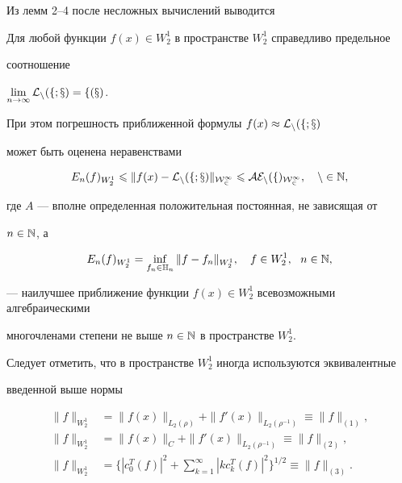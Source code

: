 Из лемм 2--4 после несложных вычислений выводится








\begin{thm}


Для любой функции $f(x) \in W_2^1$ в пространстве $W_2^1$ справедливо предельное


соотношение


$\lim\limits_{n\rightarrow \infty}\cal{L}_n(f;x)=f(x)$.


При этом погрешность приближенной формулы $f(x)\approx \cal{L}_n(f;x)$


может быть оценена неравенствами


\begin{equation}


E_n(f)_{W_2^1}\lea \|f(x)-\cal{L}_n(f;x)\|_{W_2^1} \lea A E_n(f)_{W_2^1},


\quad n\in \N,


\end{equation}


где $A$ --- вполне определенная положительная постоянная, не зависящая от 


$n \in \Bbb{N}$, а


$$


E_n(f)_{W_2^1}=\inf_{f_n \in \bH_n}\|f-f_n\|_{W_2^1},


\quad f \in W_2^1,\ \ n\in \N ,


$$


--- наилучшее приближение функции $f(x)\in W_2^1$ всевозможными алгебраическими


многочленами степени не выше $n \in \Bbb{N}$ в пространстве $W_2^1$.


\end{thm}





Следует отметить, что в пространстве $W_2^1$ иногда используются эквивалентные 


введенной выше нормы


\begin{align}


\|f\|_{W_2^1}&=\|f(x)\|_{L_2(\rho)}+\|f'(x)\|_{L_2(\rho^{-1})}\equiv\|f\|_{(1)},\\


%


\|f\|_{W_2^1}&=\|f(x)\|_C+\|f'(x)\|_{L_2(\rho^{-1})}\equiv\|f\|_{(2)},\\


%


\|f\|_{W_2^1}&=\bigg\{|c_0^T(f)|^2+\sum_{k=1}^\infty|kc_k^T(f)|^2


\bigg\}^{1/2}\equiv\|f\|_{(3)}.


\end{align}





